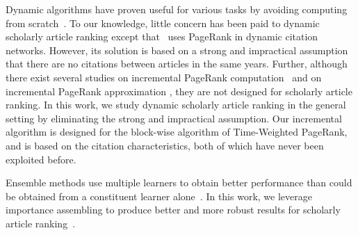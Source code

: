 Dynamic algorithms have proven useful for various tasks by avoiding computing from scratch~\cite{RamalingamR93}.
To our knowledge, little concern has been paid to dynamic scholarly article ranking except that~\cite{GhoshKHLL11} uses PageRank in dynamic citation networks. However, its solution is based on a strong and impractical assumption that there are no citations between articles in the same years.
Further, although there exist several studies on incremental PageRank computation~\cite{DesikanPSK05,AbiteboulPC03,WuR09} and on incremental PageRank approximation \cite{BahmaniCG10,BahmaniKMU12}, they are not designed for scholarly article ranking.
%
In this work, we study dynamic scholarly article ranking in the general setting by eliminating the strong and impractical assumption. Our incremental algorithm is designed for the block-wise algorithm of Time-Weighted PageRank, and is based on the citation characteristics, both of which have never been exploited before.


Ensemble methods use multiple learners to obtain better performance than could be obtained from a constituent learner alone~\cite{zhihua-book}.
In this work, we leverage  importance assembling  to produce better and more robust results for scholarly article ranking~\cite{zhihua-book,wsdmcup,DuanAMHH16}.
